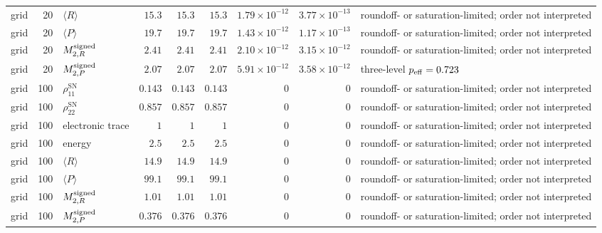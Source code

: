 \begin{landscape}
\begin{longtable}{l r l r r r r r L{0.18\textwidth}}
grid & 20 & $\langle R\rangle$ & $15.3$ & $15.3$ & $15.3$ & $1.79\times10^{-12}$ & $3.77\times10^{-13}$ & roundoff- or saturation-limited; order not interpreted \\
grid & 20 & $\langle P\rangle$ & $19.7$ & $19.7$ & $19.7$ & $1.43\times10^{-12}$ & $1.17\times10^{-13}$ & roundoff- or saturation-limited; order not interpreted \\
grid & 20 & $M^{\rm signed}_{2,R}$ & $2.41$ & $2.41$ & $2.41$ & $2.10\times10^{-12}$ & $3.15\times10^{-12}$ & roundoff- or saturation-limited; order not interpreted \\
grid & 20 & $M^{\rm signed}_{2,P}$ & $2.07$ & $2.07$ & $2.07$ & $5.91\times10^{-12}$ & $3.58\times10^{-12}$ & three-level $p_{\rm eff}=0.723$ \\
grid & 100 & $\rho_{11}^{\mathrm{SN}}$ & $0.143$ & $0.143$ & $0.143$ & $0$ & $0$ & roundoff- or saturation-limited; order not interpreted \\
grid & 100 & $\rho_{22}^{\mathrm{SN}}$ & $0.857$ & $0.857$ & $0.857$ & $0$ & $0$ & roundoff- or saturation-limited; order not interpreted \\
grid & 100 & electronic trace & $1$ & $1$ & $1$ & $0$ & $0$ & roundoff- or saturation-limited; order not interpreted \\
grid & 100 & energy & $2.5$ & $2.5$ & $2.5$ & $0$ & $0$ & roundoff- or saturation-limited; order not interpreted \\
grid & 100 & $\langle R\rangle$ & $14.9$ & $14.9$ & $14.9$ & $0$ & $0$ & roundoff- or saturation-limited; order not interpreted \\
grid & 100 & $\langle P\rangle$ & $99.1$ & $99.1$ & $99.1$ & $0$ & $0$ & roundoff- or saturation-limited; order not interpreted \\
grid & 100 & $M^{\rm signed}_{2,R}$ & $1.01$ & $1.01$ & $1.01$ & $0$ & $0$ & roundoff- or saturation-limited; order not interpreted \\
grid & 100 & $M^{\rm signed}_{2,P}$ & $0.376$ & $0.376$ & $0.376$ & $0$ & $0$ & roundoff- or saturation-limited; order not interpreted \\
\end{longtable}
\endgroup
\end{landscape}

